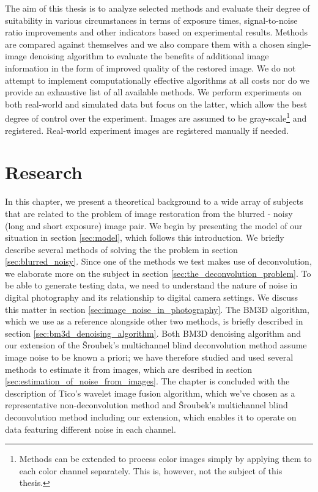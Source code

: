 \documentclass[12pt,notitlepage]{report}
\begin{document}
The aim of this thesis is to analyze selected methods and evaluate their degree of suitability in various circumstances in terms of exposure times, signal-to-noise ratio improvements and other indicators based on experimental results. Methods are compared against themselves and we also compare them with a chosen single-image denoising algorithm to evaluate the benefits of additional image information in the form of improved quality of the restored image. We do not attempt to implement computationally effective algorithms at all costs nor do we provide an exhaustive list of all available methods. We perform experiments on both real-world and simulated data but focus on the latter, which allow the best degree of control over the experiment. Images are assumed to be gray-scale\footnote[2]{Methods can be extended to process color images simply by applying them to each color channel separately. This is, however, not the subject of this thesis.} and registered. Real-world experiment images are registered manually if needed.

\clearpage

\chapter{Research}
\label{chap:research}

In this chapter, we present a theoretical background to a wide array of subjects that are related to the problem of image restoration from the blurred - noisy (long and short exposure) image pair. We begin by presenting the model of our situation in section \ref{sec:model}, which follows this introduction. We briefly describe several methods of solving the the problem in section \ref{sec:blurred_noisy}. Since one of the methods we test makes use of deconvolution, we elaborate more on the subject in section \ref{sec:the_deconvolution_problem}. To be able to generate testing data, we need to understand the nature of noise in digital photography and its relationship to digital camera settings. We discuss this matter in section  \ref{sec:image_noise_in_photography}. The BM3D algorithm, which we use as a reference alongside other two methods, is briefly described in section \ref{sec:bm3d_denoising_algorithm}. Both BM3D denoising algorithm and our extension of the Šroubek's multichannel blind deconvolution method assume image noise to be known a priori; we have therefore studied and used several methods to estimate it from images, which are desribed in section \ref{sec:estimation_of_noise_from_images}. The chapter is concluded with the description of Tico's wavelet image fusion algorithm, which we've chosen as a representative non-deconvolution method and Šroubek's multichannel blind deconvolution method including our extension, which enables it to operate on data featuring different noise in each channel.    
\end{document}
